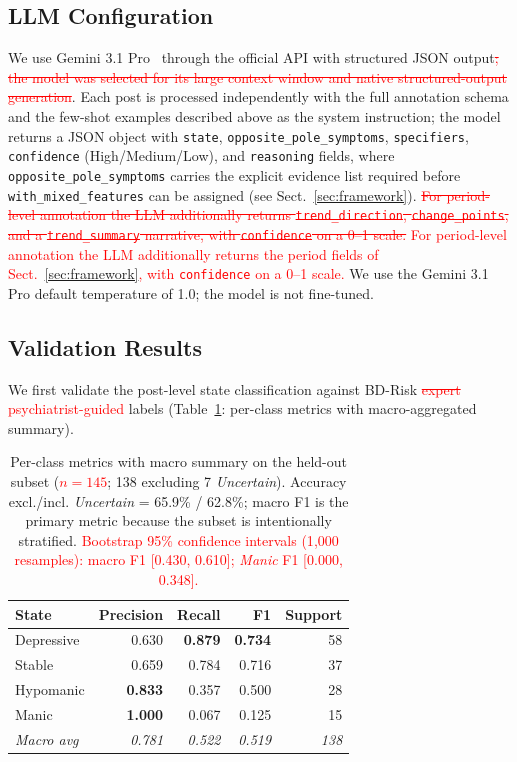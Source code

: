 \documentclass[runningheads]{llncs}
\newcommand{\rev}[1]{\textcolor{red}{#1}}
\newcommand{\del}[1]{\textcolor{red}{\sout{#1}}}
\newcommand{\rev}[1]{#1}
\newcommand{\del}[1]{}
\begin{document}
\subsection{LLM Configuration}

We use Gemini 3.1 Pro~\rev{\cite{google2026gemini31pro}} through the official API with structured JSON output\del{; the model was selected for its large context window and native structured-output generation}. Each post is processed independently with the full annotation schema and the few-shot examples described above as the system instruction; the model returns a JSON object with \texttt{state}, \texttt{opposite\_pole\_symptoms}, \texttt{specifiers}, \texttt{confidence} (High/Medium/Low), and \texttt{reasoning} fields, where \texttt{opposite\_pole\_symptoms} carries the explicit evidence list required before \texttt{with\_mixed\_features} can be assigned (see Sect.~\ref{sec:framework}). \del{For period-level annotation the LLM additionally returns \texttt{trend\_direction}, \texttt{change\_points}, and a \texttt{trend\_summary} narrative, with \texttt{confidence} on a 0--1 scale.} \rev{For period-level annotation the LLM additionally returns the period fields of Sect.~\ref{sec:framework}, with \texttt{confidence} on a 0--1 scale.} We use the Gemini 3.1 Pro default temperature of 1.0; the model is not fine-tuned.

\subsection{Validation Results}
\label{sec:bdresult}

We first validate the post-level state classification against BD-Risk \del{expert} \rev{psychiatrist-guided} labels (Table~\ref{tab:state-metrics}: per-class metrics with macro-aggregated summary).

\begin{table}[t]
\caption{Per-class metrics with macro summary on the held-out subset (\rev{$n=145$}; 138 excluding 7 \emph{Uncertain}). Accuracy excl./incl. \emph{Uncertain} = 65.9\% / 62.8\%; macro F1 is the primary metric because the subset is intentionally stratified. \rev{Bootstrap 95\% confidence intervals (1{,}000 resamples): macro F1 [0.430, 0.610]; \emph{Manic} F1 [0.000, 0.348].}}
\label{tab:state-metrics}
\centering
\setlength{\tabcolsep}{9pt}
\begin{tabular}{lrrrr}
\toprule
\textbf{State} & \textbf{Precision} & \textbf{Recall} & \textbf{F1} & \textbf{Support} \\
\midrule
Depressive & 0.630 & \textbf{0.879} & \textbf{0.734} & 58 \\
Stable & 0.659 & 0.784 & 0.716 & 37 \\
Hypomanic & \textbf{0.833} & 0.357 & 0.500 & 28 \\
Manic & \textbf{1.000} & 0.067 & 0.125 & 15 \\
\midrule
\emph{Macro avg} & \emph{0.781} & \emph{0.522} & \emph{0.519} & \emph{138} \\
\bottomrule
\end{tabular}
\end{table}
\end{document}
